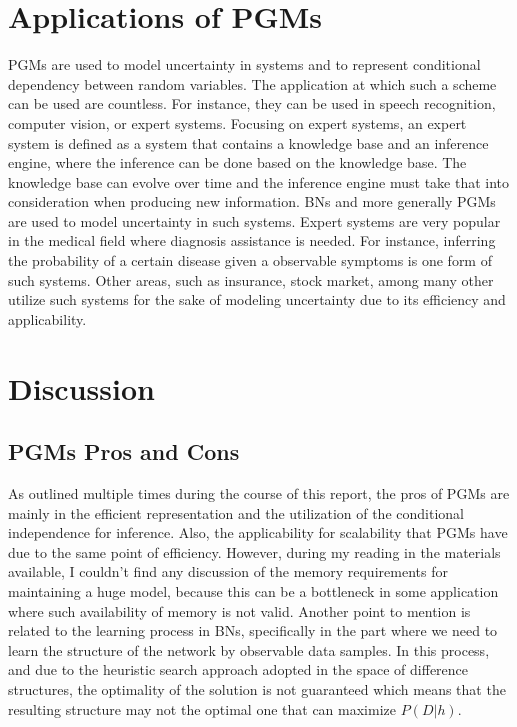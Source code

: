 \documentclass{article}
\begin{document}
\section{Applications of PGMs}
PGMs are used to model uncertainty in systems and to represent conditional dependency between random variables. The application at which such a scheme can be used are countless. For instance, they can be used in speech recognition, computer vision, or expert systems. Focusing on expert systems, an expert system is defined as a system that contains a knowledge base and an inference engine, where the inference can be done based on the knowledge base. The knowledge base can evolve over time and the inference engine must take that into consideration when producing new information. BNs and more generally PGMs are used to model uncertainty in such systems. Expert systems are very popular in the medical field where diagnosis assistance is needed. For instance, inferring the probability of a certain disease given a observable symptoms is one form of such systems. Other areas, such as insurance, stock market, among many other utilize such systems for the sake of modeling uncertainty due to its efficiency and applicability. 
\section{Discussion}
\subsection{PGMs Pros and Cons}
As outlined multiple times during the course of this report, the pros of PGMs are mainly in the efficient representation and the utilization of the conditional independence for inference. Also, the applicability for scalability that PGMs have due to the same point of efficiency. However, during my reading in the materials available, I couldn't find any discussion of the memory requirements for maintaining a huge model, because this can be a bottleneck in some application where such availability of memory is not valid. Another point to mention is related to the learning process in BNs, specifically in the part where we need to learn the structure of the network by observable data samples. In this process, and due to the heuristic search approach adopted in the space of difference structures, the optimality of the solution is not guaranteed which means that the resulting structure may not the optimal one that can maximize $P(D|h)$.
\end{document}
